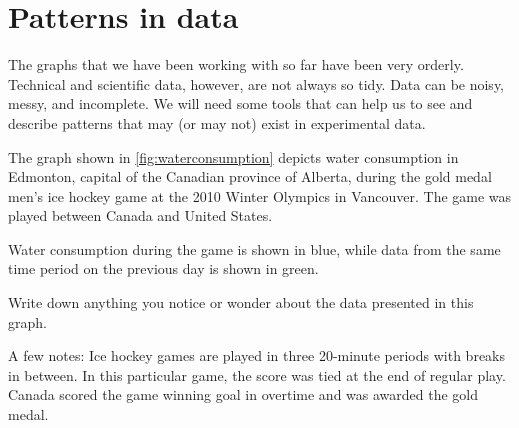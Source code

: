 \begin{boxedexplore}
\end{boxedexplore}


\section{Patterns in data}
\label{sec:patternsindata}

The graphs that we have been working with so far have been very orderly. Technical and scientific data, however, are not always so tidy. Data can be noisy, messy, and incomplete. We will need some tools that can help us to see and describe patterns that may (or may not) exist in experimental data.

\begin{boxedexplore}
\end{boxedexplore}

\begin{boxedexplore}
The graph shown in \cref{fig:waterconsumption} depicts water consumption in Edmonton, capital of the Canadian province of Alberta, during the gold medal men's ice hockey game at the 2010 Winter Olympics in Vancouver. The game was played between Canada and United States.

Water consumption during the game is shown in blue, while data from the same time period on the previous day is shown in green.

Write down anything you notice or wonder about the data presented in this graph.

A few notes: Ice hockey games are played in three 20-minute periods with breaks in between. In this particular game, the score was tied at the end of regular play. Canada scored the game winning goal in overtime and was awarded the gold medal.
\end{boxedexplore}

